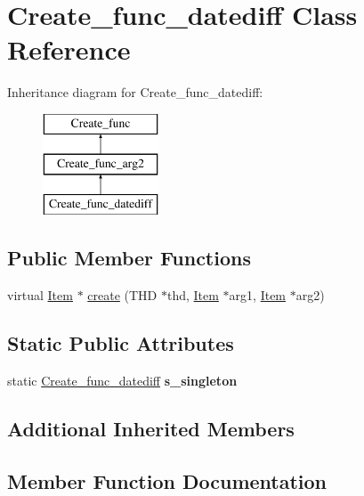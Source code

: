 \hypertarget{classCreate__func__datediff}{}\section{Create\+\_\+func\+\_\+datediff Class Reference}
\label{classCreate__func__datediff}
Inheritance diagram for Create\+\_\+func\+\_\+datediff\+:\begin{figure}[H]
\begin{center}
\leavevmode
\includegraphics[height=3.000000cm]{classCreate__func__datediff}
\end{center}
\end{figure}
\subsection*{Public Member Functions}
\begin{DoxyCompactItemize}
\item 
virtual \mbox{\hyperlink{classItem}{Item}} $\ast$ \mbox{\hyperlink{classCreate__func__datediff_ac305bdb9383ac4ba449deba308fc8363}{create}} (T\+HD $\ast$thd, \mbox{\hyperlink{classItem}{Item}} $\ast$arg1, \mbox{\hyperlink{classItem}{Item}} $\ast$arg2)
\end{DoxyCompactItemize}
\subsection*{Static Public Attributes}
\begin{DoxyCompactItemize}
\item 
\mbox{\label{classCreate__func__datediff_af24f28f9378192e4352f301cf677def8}} 
static \mbox{\hyperlink{classCreate__func__datediff}{Create\+\_\+func\+\_\+datediff}} {\bfseries s\+\_\+singleton}
\end{DoxyCompactItemize}
\subsection*{Additional Inherited Members}


\subsection{Member Function Documentation}
\mbox{\label{classCreate__func__datediff_ac305bdb9383ac4ba449deba308fc8363}} 
